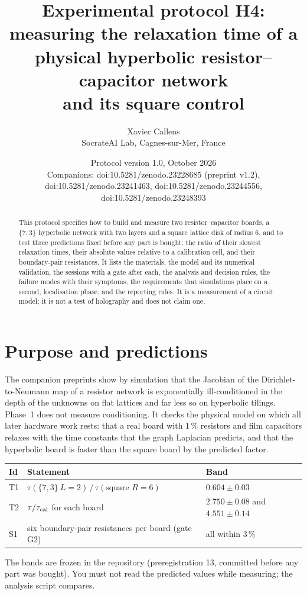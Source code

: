 \documentclass[11pt,a4paper]{article}
\title{Experimental protocol H4: measuring the relaxation time of a physical hyperbolic resistor--capacitor network\\ and its square control}
\author{Xavier Callens\\[2pt]
\small SocrateAI Lab, Cagnes-sur-Mer, France}
\date{Protocol version 1.0, October 2026\\ \small Companions: doi:10.5281/zenodo.23228685 (preprint v1.2), doi:10.5281/zenodo.23241463, doi:10.5281/zenodo.23244556, doi:10.5281/zenodo.23248393}
\begin{document}
\maketitle

\begin{abstract}\noindent
This protocol specifies how to build and measure two resistor--capacitor boards, a $\{7,3\}$ hyperbolic network with two layers and a square lattice disk of radius $6$, and to test three predictions fixed before any part is bought:
the ratio of their slowest relaxation times, their absolute values relative to a calibration cell, and their boundary-pair resistances. It lists the materials, the model and its numerical validation, the sessions with a gate after each, the analysis and decision rules, the failure modes with their symptoms, the requirements that
simulations place on a second, localisation phase, and the reporting rules. It is a measurement of a circuit model; it is not a test of holography and does not claim one.
\end{abstract}

\section{Purpose and predictions}
The companion preprints show by simulation that the Jacobian of the Dirichlet-to-Neumann map of a resistor network is exponentially ill-conditioned in the depth of the unknowns on flat lattices and far less so on hyperbolic tilings. Phase~1 does not measure conditioning. It checks the physical model on which all later hardware work rests:
that a real board with $1\,\%$ resistors and film capacitors relaxes with the time constants that the graph Laplacian predicts, and that the hyperbolic board is faster than the square board by the predicted factor.

\begin{center}\begin{tabular}{lll}\toprule
Id & Statement & Band \\ \midrule
T1 & $\tau(\{7,3\}\ L{=}2)\,/\,\tau(\text{square }R{=}6)$ & $0.604\pm0.03$ \\
T2 & $\tau/\tau_{\rm cal}$ for each board & $2.750\pm0.08$ and $4.551\pm0.14$ \\
S1 & six boundary-pair resistances per board (gate G2) & all within $3\,\%$ \\ \bottomrule
\end{tabular}\end{center}
The bands are frozen in the repository (preregistration 13, committed before any part was bought). You must not read the predicted values while measuring; the analysis script compares.
\end{document}
